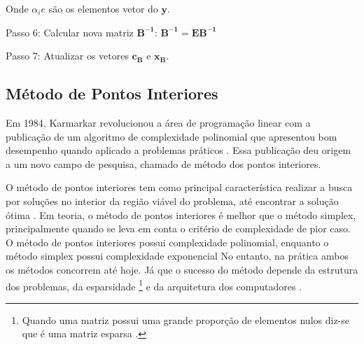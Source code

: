 Onde $\mathit{\alpha{_ie}}$ são os elementos vetor do $\mathbf{y}$.

Passo 6: Calcular nova matriz $\mathbf{B^{-1}}$: $\mathbf{B^{-1}} = \mathbf{EB^{-1}}$

Passo 7: Atualizar os vetores $\mathbf{c{_B}}$ e $\mathbf{x{_B}}$.

\subsection{Método de Pontos Interiores}
Em 1984, Karmarkar revolucionou a área de programação linear com a publicação de um algoritmo de complexidade polinomial que apresentou bom desempenho quando aplicado a problemas práticos \cite{MaculanPI}. Essa publicação deu origem a um novo campo de pesquisa, chamado de método dos pontos interiores. 

O método de pontos interiores tem como principal característica realizar a busca por soluções no interior da região viável do problema, até encontrar a solução ótima \cite{Pinto}.
Em teoria, o método de pontos interiores é melhor que o método simplex, principalmente quando se leva em conta o critério de complexidade de pior caso. O método de pontos interiores possui complexidade polinomial, enquanto o método simplex possui complexidade exponencial No entanto, na prática ambos os métodos concorrem até hoje. Já que o sucesso do método depende da estrutura dos problemas, da esparsidade \footnote{Quando uma matriz possui uma grande proporção de elementos nulos diz-se que é uma matriz esparsa \cite{Munari}.} e da arquitetura dos computadores \cite{MaculanPI}.
